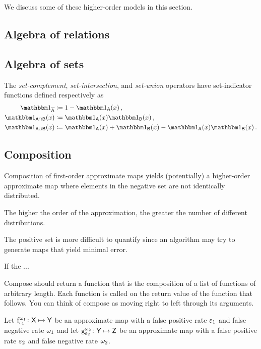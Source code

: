 \documentclass[11pt,final,hidelinks]{article}
\begin{document}
We discuss some of these higher-order models in this section.


\subsection{Algebra of relations}

\subsection{Algebra of sets}
The \emph{set-complement}, \emph{set-intersection}, and \emph{set-union} operators have set-indicator functions defined respectively as
\begin{align}
	\SetIndicator{\SetComplement[\Set{A}]} 				&\coloneqq 1-\SetIndicator{\Set{A}}(x)\,,\\
	\SetIndicator{\Set{A} \SetIntersection \Set{B}}(x) 	&\coloneqq \SetIndicator{\Set{A}}(x) \SetIndicator{\Set{B}}(x)\,,\\
	\SetIndicator{\Set{A} \SetUnion \Set{B}}(x) 		&\coloneqq \SetIndicator{\Set{A}}(x) + \SetIndicator{\Set{B}}(x) - \SetIndicator{\Set{A}}(x) \SetIndicator{\Set{B}}(x)\,.
\end{align}


\subsection{Composition}
\label{sec:comp_map}
Composition of first-order approximate maps yields (potentially) a higher-order approximate map where elements in the negative set are not identically distributed.

The higher the order of the approximation, the greater the number of different distributions.

The positive set is more difficult to quantify since an algorithm may try to generate maps that yield minimal error.

If the ...




Compose should return a function that is the composition of a list of functions of arbitrary length. Each function is called on the return value of the function that follows. You can think of compose as moving right to left through its arguments.

Let $\APFun{f}[\fprate_1][\fnrate_1] \colon \Set{X} \mapsto \Set{Y}$ be an approximate map with a false positive rate $\varepsilon_1$ and false negative rate $\omega_1$ and let $\APFun{g}[\fprate_2][\fnrate_2] \colon \Set{Y} \mapsto \Set{Z}$ be an approximate map with a false positive rate $\varepsilon_2$ and false negative rate $\omega_2$.
\end{document}
